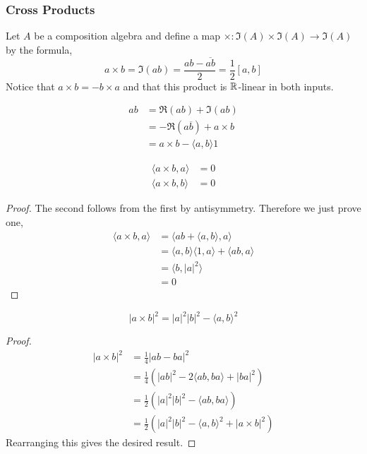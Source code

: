 \subsubsection{Cross Products}
\begin{defn}
Let $A$ be a composition algebra and define a map $\times : \Im(A)\times \Im(A)\to \Im(A)$ by the formula,
\begin{equation}
    a\times b = \Im(ab) = \frac{ab-\overline{ab}}{2}=\frac{1}{2}[a,b]
\end{equation}
Notice that $a\times b=-b\times a$ and that this product is $\operatorname{\mathbb{R}}$-linear in both inputs.
\end{defn}
\begin{remark*}
    \begin{align*}
        ab&=\Re(ab)+\Im(ab)\\
        &=-\Re(a\overline{b})+a\times b\\
        &= a\times b - \langle a,b\rangle 1
    \end{align*}
\end{remark*}
\begin{lemma}
    \begin{align}
        \langle a\times b,a\rangle &=0\\
        \langle a\times b,b\rangle &= 0
    \end{align}
\end{lemma}
\begin{proof}
The second follows from the first by antisymmetry. Therefore we just prove one,
    \begin{align*}
        \langle a\times b,a\rangle &= \langle ab+\langle a,b\rangle,a\rangle\\
        &= \langle a,b\rangle\langle 1,a\rangle + \langle ab,a\rangle\\
        &= \langle b,|a|^2\rangle\\
        &= 0
    \end{align*}
\end{proof}
\begin{lemma}
    \begin{equation}
        |a\times b|^2 = |a|^2|b|^2-\langle a,b\rangle^2
    \end{equation}
\end{lemma}
\begin{proof}
    \begin{align*}
        |a\times b|^2 &= \frac{1}{4}|ab-ba|^2\\
        &= \frac{1}{4}(|ab|^2 - 2\langle ab,ba\rangle+|ba|^2)\\
        &= \frac{1}{2}(|a|^2|b|^2-\langle ab,ba\rangle)\\
        &= \frac{1}{2}(|a|^2|b|^2-\langle a,b\rangle^2 + |a\times b|^2)
    \end{align*}
    Rearranging this gives the desired result.
\end{proof}
